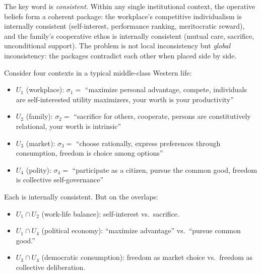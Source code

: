The key word is \emph{consistent}.
Within any single institutional context, the operative beliefs form a coherent package: the workplace's competitive individualism is internally consistent (self-interest, performance ranking, meritocratic reward), and the family's cooperative ethos is internally consistent (mutual care, sacrifice, unconditional support).
The problem is not local inconsistency but \emph{global} inconsistency: the packages contradict each other when placed side by side.

\begin{example}
\label{ex:local-contradiction}
Consider four contexts in a typical middle-class Western life:
\begin{itemize}[nosep]
  \item $U_1$ (workplace): $\sigma_1 = $ ``maximize personal advantage, compete, individuals are self-interested utility maximizers, your worth is your productivity''
  \item $U_2$ (family): $\sigma_2 = $ ``sacrifice for others, cooperate, persons are constitutively relational, your worth is intrinsic''
  \item $U_3$ (market): $\sigma_3 = $ ``choose rationally, express preferences through consumption, freedom is choice among options''
  \item $U_4$ (polity): $\sigma_4 = $ ``participate as a citizen, pursue the common good, freedom is collective self-governance''
\end{itemize}
Each is internally consistent.
But on the overlaps:
\begin{itemize}[nosep]
  \item $U_1 \cap U_2$ (work-life balance): self-interest vs.\ sacrifice.
  \item $U_1 \cap U_4$ (political economy): ``maximize advantage'' vs.\ ``pursue common good.''
  \item $U_3 \cap U_4$ (democratic consumption): freedom as market choice vs.\ freedom as collective deliberation.
\end{itemize}
\end{example}

